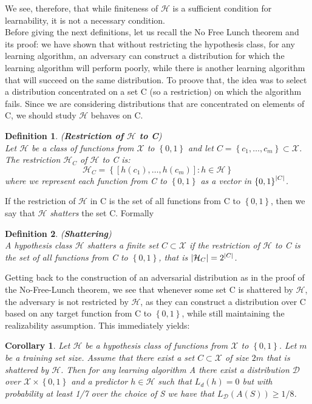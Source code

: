 \documentclass[12pt]{report}
\theoremstyle{plain}
\newtheorem{DEF}{Definition}
\newtheorem{COR}{Corollary}
\newcommand\mcl[1]{\mathcal{#1}}
\begin{document}
\begin{flushleft}
We see, therefore, that while finiteness of $\mcl{H}$ is a sufficient condition for learnability, it is not a necessary condition.\\
Before giving the next definitions, let us recall the No Free Lunch theorem and its proof: we have shown that without restricting the hypothesis class, for any learning algorithm, an adversary can construct a distribution for which the learning algorithm will perform poorly, while there is another learning algorithm that will succeed on the same distribution. To proove that, the idea was to select a distribution concentrated on a set C (so a restriction) on which the algorithm fails. Since we are considering distributions that are concentrated on elements of C, we should study $\mcl{H}$ behaves on C.
\begin{DEF}(\textbf{Restriction of $\mcl{H}$ to C})\\
	Let $\mcl{H}$ be a class of functions from $\mcl{X}$ to $\left\{0,1\right\}$ and let $C=\left\{c_1,\dots ,c_m\right\}\subset\mcl{X}$. The restriction $\mcl{H}_C$ of $\mcl{H}$ to C is:
	\[ \mcl{H}_C=\left\{\left[h(c_1),\dots ,h(c_m)\right] :h\in\mcl{H}\right\} \]
	where we represent each function from C to $\left\{0,1\right\}$ as a vector in $\left\{0,1\right\}^\abs{C}$.
\end{DEF}
If the restriction of $\mcl{H}$ in C is the set of all functions from C to $\left\{0,1\right\}$, then we say that $\mcl{H}$ \textit{shatters} the set C. Formally
\begin{DEF}(\textbf{Shattering})\\
	A hypothesis class $\mcl{H}$ shatters a finite set $C\subset\mcl{X}$ if the restriction of $\mcl{H}$ to C is the set of all functions from C to $\left\{0,1\right\}$, that is $\abs{\mcl{H}_C} =2^\abs{C}$.
\end{DEF}
Getting back to the construction of an adversarial distribution as in the proof of the No-Free-Lunch theorem, we see that whenever some set C is shattered by $\mcl{H}$, the adversary is not restricted by $\mcl{H}$, as they can construct a distribution over C based on any target function from C to $\left\{0,1\right\}$, while still maintaining the realizability assumption. This immediately yields:
\begin{COR}
	Let $\mcl{H}$ be a hypothesis class of functions from $\mcl{X}$ to $\left\{0,1\right\}$. Let $m$ be a training set size. Assume that there exist a set $C\subset\mcl{X}$ of size $2m$ that is shattered by $\mcl{H}$. Then for any learning algorithm A there exist a distribution $\mcl{D}$ over $\mcl{X}\times\left\{0,1\right\}$ and a predictor $h\in\mcl{H}$ such that $L_d(h)=0$ but with probability at least 1/7 over the choice of S we have that $L_\mcl{D}(A(S))\geq 1/8$.

\end{COR}
\end{flushleft}
\end{document}
